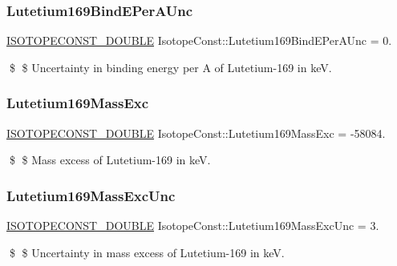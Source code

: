 \subsubsection{\texorpdfstring{Lutetium169\+Bind\+E\+Per\+A\+Unc}{Lutetium169BindEPerAUnc}}
{\footnotesize\ttfamily \mbox{\hyperlink{group___isotope_const-_macros_ga8f45a7272ce02c0b4c65c44636ed719a}{I\+S\+O\+T\+O\+P\+E\+C\+O\+N\+S\+T\+\_\+\+D\+O\+U\+B\+LE}} Isotope\+Const\+::\+Lutetium169\+Bind\+E\+Per\+A\+Unc = 0.}

\$ \$ Uncertainty in binding energy per A of Lutetium-\/169 in keV. \mbox{\label{group___isotope_const-_lutetium-_lu169_gaaee4a6913d0d72e26d43561f8e7608a4}} 
\subsubsection{\texorpdfstring{Lutetium169\+Mass\+Exc}{Lutetium169MassExc}}
{\footnotesize\ttfamily \mbox{\hyperlink{group___isotope_const-_macros_ga8f45a7272ce02c0b4c65c44636ed719a}{I\+S\+O\+T\+O\+P\+E\+C\+O\+N\+S\+T\+\_\+\+D\+O\+U\+B\+LE}} Isotope\+Const\+::\+Lutetium169\+Mass\+Exc = -\/58084.}

\$ \$ Mass excess of Lutetium-\/169 in keV. \mbox{\label{group___isotope_const-_lutetium-_lu169_ga10638174ceaec23074c34c8fe047eea9}} 
\subsubsection{\texorpdfstring{Lutetium169\+Mass\+Exc\+Unc}{Lutetium169MassExcUnc}}
{\footnotesize\ttfamily \mbox{\hyperlink{group___isotope_const-_macros_ga8f45a7272ce02c0b4c65c44636ed719a}{I\+S\+O\+T\+O\+P\+E\+C\+O\+N\+S\+T\+\_\+\+D\+O\+U\+B\+LE}} Isotope\+Const\+::\+Lutetium169\+Mass\+Exc\+Unc = 3.}

\$ \$ Uncertainty in mass excess of Lutetium-\/169 in keV. \mbox{\label{group___isotope_const-_lutetium-_lu169_ga5642f8080d0f102e8a7822205dd384b2}} 
